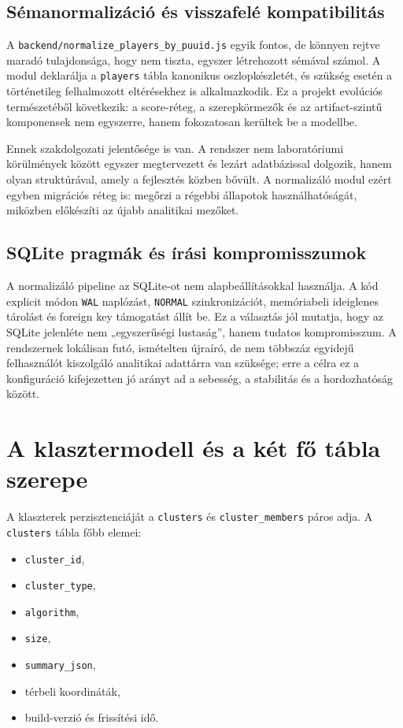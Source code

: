 ﻿\documentclass[a4paper,12pt]{report}
\begin{document}
\subsection{Sémanormalizáció és visszafelé kompatibilitás}

A \texttt{backend/normalize\_players\_by\_puuid.js} egyik fontos, de könnyen rejtve maradó tulajdonsága, hogy nem tiszta, egyszer létrehozott sémával számol. A modul deklarálja a \texttt{players} tábla kanonikus oszlopkészletét, és szükség esetén a történetileg felhalmozott eltérésekhez is alkalmazkodik. Ez a projekt evolúciós természetéből következik: a score-réteg, a szerepkörmezők és az artifact-szintű komponensek nem egyszerre, hanem fokozatosan kerültek be a modellbe.

Ennek szakdolgozati jelentősége is van. A rendszer nem laboratóriumi körülmények között egyszer megtervezett és lezárt adatbázissal dolgozik, hanem olyan struktúrával, amely a fejlesztés közben bővült. A normalizáló modul ezért egyben migrációs réteg is: megőrzi a régebbi állapotok használhatóságát, miközben előkészíti az újabb analitikai mezőket.

\subsection{SQLite pragmák és írási kompromisszumok}

A normalizáló pipeline az SQLite-ot nem alapbeállításokkal használja. A kód explicit módon \texttt{WAL} naplózást, \texttt{NORMAL} szinkronizációt, memóriabeli ideiglenes tárolást és foreign key támogatást állít be. Ez a választás jól mutatja, hogy az SQLite jelenléte nem „egyszerűségi lustaság”, hanem tudatos kompromisszum. A rendszernek lokálisan futó, ismételten újraíró, de nem többszáz egyidejű felhasználót kiszolgáló analitikai adattárra van szüksége; erre a célra ez a konfiguráció kifejezetten jó arányt ad a sebesség, a stabilitás és a hordozhatóság között.

\section{A klasztermodell és a két fő tábla szerepe}

A klaszterek perzisztenciáját a \texttt{clusters} és \texttt{cluster\_members} páros adja. A \texttt{clusters} tábla főbb elemei:

\begin{itemize}
    \item \texttt{cluster\_id},
    \item \texttt{cluster\_type},
    \item \texttt{algorithm},
    \item \texttt{size},
    \item \texttt{summary\_json},
    \item térbeli koordináták,
    \item build-verzió és frissítési idő.
\end{itemize}
\end{document}

